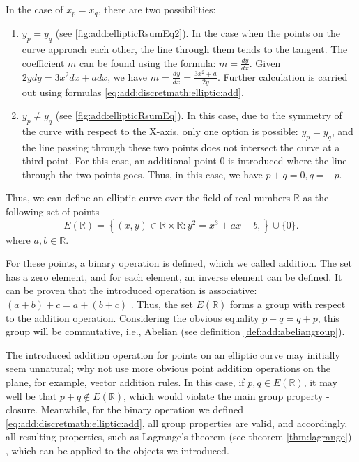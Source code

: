 In the case of $x_p = x_q$, there are two possibilities:
\begin{enumerate}
\item $y_p = y_q$ (see \autoref{fig:add:ellipticRsumEq2}). In the case when the points on the curve approach each other, the line through them tends to the tangent. The coefficient $m$ can be found using the formula: $m = \frac{dy}{dx}$. Given $2ydy = 3x^2 dx + a dx$, we have $m = \frac{dy}{dx} = \frac{3 x^2 + a}{2y}$. Further calculation is carried out using formulas \eqref{eq:add:discretmath:elliptic:add}. 
\item $y_p \ne y_q$ (see \autoref{fig:add:ellipticRsumEq}). In this case, due to the symmetry of the curve with respect to the X-axis, only one option is possible: $y_p = y_q$, and the line passing through these two points does not intersect the curve at a third point. For this case, an additional point $0$ is introduced where the line through the two points goes. Thus, in this case, we have $p + q = 0, q = -p$.
\end{enumerate}

Thus, we can define an elliptic curve over the field of real numbers $\mathbb{R}$
as the following set of points
\begin{equation}
E\left(\mathbb{R}\right) = \left\{ (x,y) \in \mathbb{R} \times \mathbb{R}: y^2 = x^3 +ax +b, 
\right\} \cup \{0\}.
\label{eq:add:discretmath:elliptic:er}
\end{equation}
where $a,b \in \mathbb{R}$.

For these points, a binary operation is defined, which we called addition. The set has a zero element, and for each element, an inverse element can be defined. It can be proven that the introduced operation is associative: $(a+b) + c = a + (b+c)$ \cite{Washington:2008:ECN:1388394}. Thus, the set $E\left(\mathbb{R}\right)$ forms a group with respect to the addition operation. Considering the obvious equality $p + q = q + p$, this group will be commutative, i.e., Abelian (see definition \ref{def:add:abeliangroup}).   

\begin{remark}
The introduced addition operation for points on an elliptic curve may initially seem unnatural; why not use more obvious point addition operations on the plane, for example, vector addition rules. In this case, if $p,q \in E\left(\mathbb{R}\right)$, it may well be that $p + q \not\in E\left(\mathbb{R}\right)$, which would violate the main group property - closure. Meanwhile, for the binary operation we defined \eqref{eq:add:discretmath:elliptic:add}, all group properties are valid, and accordingly, all resulting properties, such as Lagrange's theorem (see theorem \ref{thm:lagrange}) , which can be applied to the objects we introduced.
\end{remark}

